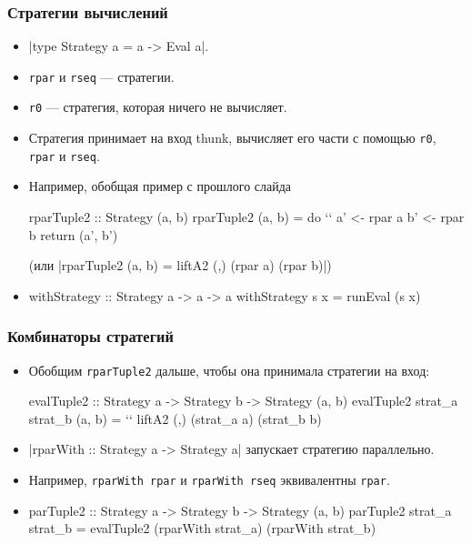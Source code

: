 \documentclass[11pt]{beamer}
\begin{document}
\begin{frame}[fragile]
\frametitle{Стратегии вычислений}
\begin{itemize}
    \item \haskinline|type Strategy a = a -> Eval a|. 
    \item \lstinline|rpar| и \lstinline|rseq| --- стратегии.
    \item \lstinline|r0| --- стратегия, которая ничего не вычисляет.
    \item Стратегия принимает на вход thunk, вычисляет его части с помощью \lstinline|r0|, \lstinline|rpar| и \lstinline|rseq|.
    \item Например, обобщая пример с прошлого слайда
\begin{haskell}
rparTuple2 :: Strategy (a, b)
rparTuple2 (a, b) = do `\pause`
  a' <- rpar a
  b' <- rpar b
  return (a', b')
\end{haskell}
    \pause
    (или \haskinline[fontsize=\small]|rparTuple2 (a, b) = liftA2 (,) (rpar a) (rpar b)|)
    \item 
\begin{haskell}
withStrategy :: Strategy a -> a -> a
withStrategy s x = runEval (s x)
\end{haskell}
\end{itemize}
\end{frame}

\begin{frame}[fragile]
\frametitle{Комбинаторы стратегий}
\begin{itemize}
    \item Обобщим \lstinline|rparTuple2| дальше, чтобы она принимала стратегии на вход:
    \begin{haskell}
evalTuple2 :: Strategy a -> Strategy b -> 
  Strategy (a, b)
evalTuple2 strat_a strat_b (a, b) = `\pause` 
  liftA2 (,) (strat_a a) (strat_b b)
    \end{haskell}
    \pause
    \item \haskinline|rparWith :: Strategy a -> Strategy a| запускает стратегию параллельно.
    \item Например, \lstinline|rparWith rpar| и \lstinline|rparWith rseq| эквивалентны \lstinline|rpar|.
    \pause
    \item 
\begin{haskell}
parTuple2 :: Strategy a -> Strategy b -> 
  Strategy (a, b)
parTuple2 strat_a strat_b = 
  evalTuple2 (rparWith strat_a) (rparWith strat_b)
\end{haskell}
\end{itemize}
\end{frame}
\end{document}

